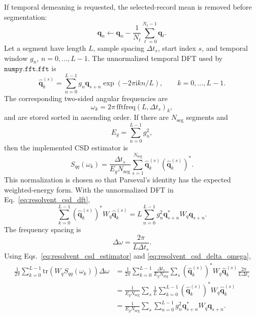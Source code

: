 \documentclass[11pt]{article}
\newcommand{\ii}{\mathrm{i}}
\newcommand{\bfq}{\bm{q}}
\begin{document}
If temporal demeaning is requested, the selected-record mean is removed before
segmentation:
\begin{equation}
  \bfq_n \leftarrow
  \bfq_n
  -
  \frac{1}{N_t}\sum_{\ell=0}^{N_t-1}\bfq_{\ell}.
  \label{eq:resolvent_temporal_demean}
\end{equation}
Let a segment have length \(L\), sample spacing \(\Delta t_s\), start index
\(s\), and temporal window \(g_n\), \(n=0,\ldots,L-1\). The unnormalized temporal
DFT used by \(\texttt{numpy.fft.fft}\) is
\begin{equation}
  \widehat{\bfq}^{(s)}_k
  =
  \sum_{n=0}^{L-1}
  g_n\bfq_{s+n}
  \exp\left(-2\pi\ii kn/L\right),
  \qquad k=0,\ldots,L-1.
  \label{eq:resolvent_csd_dft}
\end{equation}
The corresponding two-sided angular frequencies are
\begin{equation}
  \omega_k = 2\pi\,\mathrm{fftfreq}(L,\Delta t_s)_k,
  \label{eq:resolvent_csd_frequency_grid}
\end{equation}
and are stored sorted in ascending order. If there are \(N_{\mathrm{seg}}\)
segments and
\begin{equation}
  E_g=\sum_{n=0}^{L-1}g_n^2,
  \label{eq:resolvent_window_energy}
\end{equation}
then the implemented CSD estimator is
\begin{equation}
  S_{qq}(\omega_k)
  =
  \frac{\Delta t_s}{E_g N_{\mathrm{seg}}}
  \sum_{s=1}^{N_{\mathrm{seg}}}
  \widehat{\bfq}^{(s)}_k
  \left(\widehat{\bfq}^{(s)}_k\right)^*.
  \label{eq:resolvent_csd_estimator}
\end{equation}
This normalization is chosen so that Parseval's identity has the expected
weighted-energy form. With the unnormalized DFT in
Eq.~\eqref{eq:resolvent_csd_dft},
\begin{equation}
  \sum_{k=0}^{L-1}
  \left(\widehat{\bfq}^{(s)}_k\right)^*W_q
  \widehat{\bfq}^{(s)}_k
  =
  L\sum_{n=0}^{L-1}g_n^2\bfq_{s+n}^*W_q\bfq_{s+n}.
  \label{eq:resolvent_csd_parseval_dft}
\end{equation}
The frequency spacing is
\begin{equation}
  \Delta\omega=\frac{2\pi}{L\Delta t_s}.
  \label{eq:resolvent_csd_delta_omega}
\end{equation}
Using Eqs.~\eqref{eq:resolvent_csd_estimator} and
\eqref{eq:resolvent_csd_delta_omega},
\begin{align}
  \frac{1}{2\pi}
  \sum_{k=0}^{L-1}
  \mathrm{tr}\!\left(W_qS_{qq}(\omega_k)\right)
  \Delta\omega
  &=
  \frac{1}{2\pi}
  \sum_{k=0}^{L-1}
  \frac{\Delta t_s}{E_gN_{\mathrm{seg}}}
  \sum_s
  \left(\widehat{\bfq}^{(s)}_k\right)^*W_q
  \widehat{\bfq}^{(s)}_k
  \frac{2\pi}{L\Delta t_s}
  \nonumber\\
  &=
  \frac{1}{E_gN_{\mathrm{seg}}}
  \sum_s
  \frac{1}{L}
  \sum_{k=0}^{L-1}
  \left(\widehat{\bfq}^{(s)}_k\right)^*W_q
  \widehat{\bfq}^{(s)}_k
  \nonumber\\
  &=
  \frac{1}{E_gN_{\mathrm{seg}}}
  \sum_s
  \sum_{n=0}^{L-1}
  g_n^2\bfq_{s+n}^*W_q\bfq_{s+n}.
  \label{eq:resolvent_csd_parseval_result}
\end{align}
\end{document}

